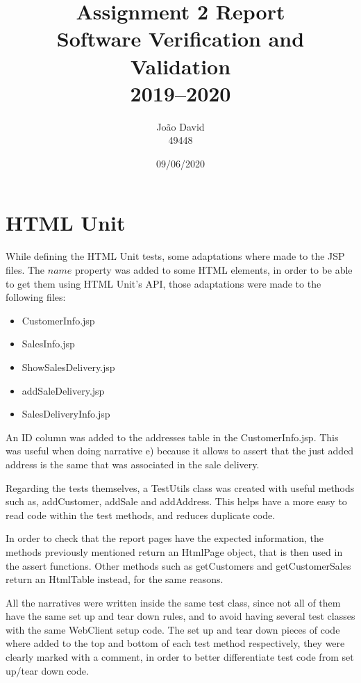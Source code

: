 \documentclass[12pt]{article}
\title{Assignment 2 Report \\
  \Large Software Verification and Validation \\ 2019--2020
}
\author{
  João David\\49448
}
\date{09/06/2020}
\begin{document}
\maketitle

\section{HTML Unit}
While defining the HTML Unit tests, some adaptations where made to the JSP files. The $name$ property was added to some HTML elements, in order to be able to get them using HTML Unit's API, those adaptations were made to the following files:

\begin{itemize}
   \item  CustomerInfo.jsp
   
   \item  SalesInfo.jsp
   
   \item  ShowSalesDelivery.jsp
   
   \item  addSaleDelivery.jsp  
   
   \item  SalesDeliveryInfo.jsp
\end{itemize}
An ID column was added to the addresses table in the CustomerInfo.jsp. This was useful when doing narrative e) because it allows to assert that the just added address is the same that was associated in the sale delivery.

Regarding the tests themselves, a TestUtils class was created with useful methods such as, addCustomer, addSale and addAddress. This helps have a more easy to read code within the test methods, and reduces duplicate code.

In order to check that the report pages have the expected information, the methods previously mentioned return an HtmlPage object, that is then used in the assert functions.
Other methods such as getCustomers and getCustomerSales return an HtmlTable instead, for the same reasons. 

All the narratives were written inside the same test class, since not all of them have the same set up and tear down rules, and to avoid having several test classes with the same WebClient setup code. The set up and tear down pieces of code where added to the top and bottom of each test method respectively, they were clearly marked with a comment, in order to better differentiate test code from set up/tear down code.
\newpage
\end{document}
